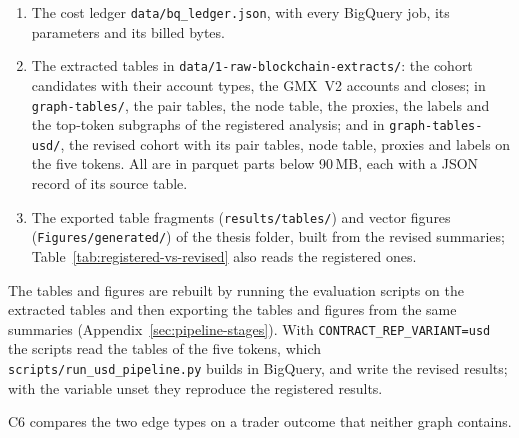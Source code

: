 \begin{enumerate}
\item The cost ledger \texttt{data/bq\_ledger.json}, with every BigQuery job, its parameters and its billed bytes.
\item The extracted tables in \texttt{data/1-raw-blockchain-extracts/}: the cohort candidates with their account types, the GMX~V2 accounts and closes; in \texttt{graph-tables/}, the pair tables, the node table, the proxies, the labels and the top-token subgraphs of the registered analysis; and in \texttt{graph-tables-usd/}, the revised cohort with its pair tables, node table, proxies and labels on the five tokens. All are in parquet parts below 90\,MB, each with a JSON record of its source table.
\item The exported table fragments (\texttt{results/tables/}) and vector figures (\texttt{Figures/generated/}) of the thesis folder, built from the revised summaries; Table~\ref{tab:registered-vs-revised} also reads the registered ones.
\end{enumerate}

The tables and figures are rebuilt by running the evaluation scripts on the extracted tables and then exporting the tables and figures from the same summaries (Appendix~\ref{sec:pipeline-stages}). With \texttt{CONTRACT\_REP\_VARIANT=usd} the scripts read the tables of the five tokens, which \texttt{scripts/run\_usd\_pipeline.py} builds in BigQuery, and write the revised results; with the variable unset they reproduce the registered results.


C6 compares the two edge types on a trader outcome that neither graph contains.

